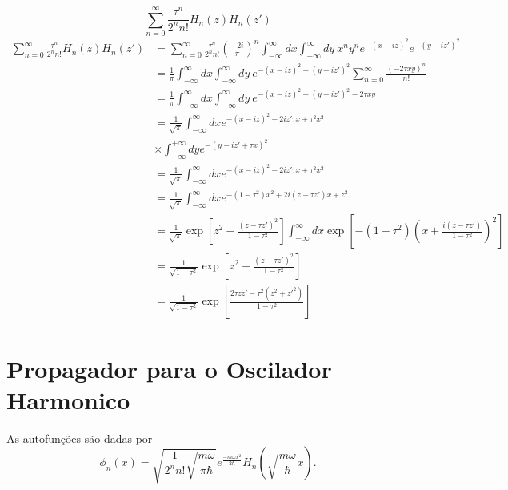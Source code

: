 \documentclass{book}
\begin{document}
 \begin{equation}
 	\sum_{n=0}^{\infty} \frac{\tau^n}{2^n n!}H_n(z)H_n(z')
 \end{equation}
 \begin{align}
 	\sum_{n=0}^{\infty} \frac{\tau^n}{2^n n!} H_n(z) H_n(z') &= \sum_{n=0}^{\infty} \frac{\tau^n}{2^n n!} \left( \frac{-2i}{\pi} \right)^n \int_{-\infty}^{\infty} dx \int_{-\infty}^{\infty} dy \ x^n y^n e^{-(x-iz)^2} e^{-(y-iz')^2} \nonumber\\
 	&= \frac{1}{\pi} \int_{-\infty}^{\infty} dx \int_{-\infty}^{\infty} dy \ e^{-(x-iz)^2 - (y-iz')^2} \sum_{n=0}^{\infty} \frac{(-2\tau xy)^n}{n!} \nonumber\\
 	&= \frac{1}{\pi} \int_{-\infty}^{\infty} dx \int_{-\infty}^{\infty} dy \ e^{-(x-iz)^2 - (y-iz')^2 - 2\tau xy} \nonumber\\
 	&= \frac{1}{\sqrt{\pi}} \int_{-\infty}^{\infty} dx e^{-(x-iz)^2 - 2iz'\tau x+\tau^2x^2} \nonumber \\
 	& \times  \int_{-\infty}^{+\infty} dy e^{-(y-iz'+\tau x)^2 } \nonumber\\
 	&= \frac{1}{\sqrt{\pi}} \int_{-\infty}^{\infty} dx e^{-(x-iz)^2 - 2iz'\tau x+\tau^2x^2} \nonumber  \\
 	&= \frac{1}{\sqrt{\pi}} \int_{-\infty}^{\infty} dx e^{-(1-\tau^2)x^2 + 2i(z-\tau z')x+z^2} \nonumber\\
 	&= \frac{1}{\sqrt{\pi}} \exp \left[ z^2 - \frac{(z-\tau z')^2}{1-\tau^2} \right] \int_{-\infty}^{\infty} dx \exp \left[ -(1-\tau^2) \left( x + \frac{i(z-\tau z')}{1-\tau^2} \right)^2 \right] \nonumber\\
 	&= \frac{1}{\sqrt{1-\tau^2}} \exp \left[ z^2 - \frac{(z-\tau z')^2}{1-\tau^2} \right] \nonumber \\
 	&= \frac{1}{\sqrt{1-\tau^2}} \exp \left[ \frac{2\tau zz' - \tau^2(z^2+z'^2)}{1-\tau^2} \right] \label{Mehler}
 \end{align}
 \newpage
 
 \section{Propagador para o Oscilador Harmonico}
 
 As autofunções são dadas por
 \begin{equation}
 	\phi_n(x) = \sqrt{\frac{1}{2^n n!} \sqrt{\frac{m\omega}{\pi\hbar}}} e^{\frac{-m\omega x^2}{2\hbar}} H_n \left( \sqrt{\frac{m\omega}{\hbar}} x \right). 
 \end{equation}
 
\end{document}
